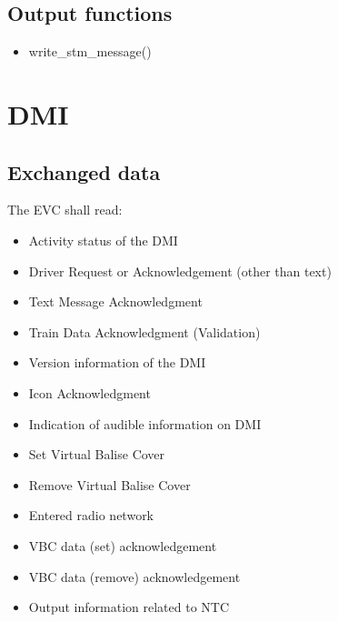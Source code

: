 \documentclass{template/openetcs_article}
\begin{document}
	\subsection{Output functions}
		\begin{itemize}
			\item write\_stm\_message()
		\end{itemize}
		
\section{DMI}
	\subsection{Exchanged data}
		The EVC shall read:
		\begin{itemize}
			\item Activity status of the DMI
			\item Driver Request or Acknowledgement (other than text)
			\item Text Message Acknowledgment
			\item Train Data Acknowledgment (Validation)
			\item Version information of the DMI
			\item Icon Acknowledgment 
			\item Indication of audible information on DMI
			\item Set Virtual Balise Cover
			\item Remove Virtual Balise Cover
			\item Entered radio network
			\item VBC data (set) acknowledgement
			\item VBC data (remove) acknowledgement
			\item Output information related to NTC
		\end{itemize}
			
\end{document}
